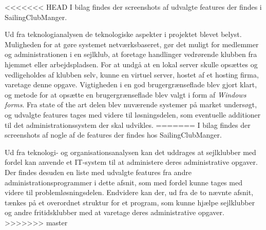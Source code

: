 <<<<<<< HEAD
I bilag  findes der screenshots af udvalgte features der findes i SailingClubManger.

Ud fra teknologianalysen de teknologiske aspekter i projektet blevet belyst. 
Muligheden for at gøre systemet netværksbaseret, gør det muligt for medlemmer og administrationen i en sejlklub, at foretage handlinger vedrørende klubben fra hjemmet eller arbejdspladsen. 
For at undgå at en lokal server skulle opsættes og vedligeholdes af klubben selv, kunne en virtuel server, hostet af et hosting firma, varetage denne opgave.
Vigtigheden i en god brugergrænseflade blev gjort klart, og metode for at opsætte en brugergrænseflade blev valgt i form af \textit{Windows forms}.
Fra state of the art delen blev nuværende systemer på market undersøgt, og udvalgte features tages med videre til løsningsdelen, som eventuelle additioner til det administrationssystem der skal udvikles.  
=======
I bilag  findes der screenshots af nogle af de features der findes hos SailingClubManger.

Ud fra teknologi- og organisationsanalysen kan det uddrages at sejlklubber med fordel kan anvende et IT-system til at administere deres administrative opgaver. Der findes desuden en liste med udvalgte features fra andre administrationsprogrammer i dette afsnit, som med fordel kunne tages med videre til problemløsningsdelen. 
Endvidere kan der, ud fra de to nævnte afsnit, tænkes på et overordnet struktur for et program, som kunne hjælpe sejlklubber og andre fritidsklubber med at varetage deres administrative opgaver.  
>>>>>>> master
